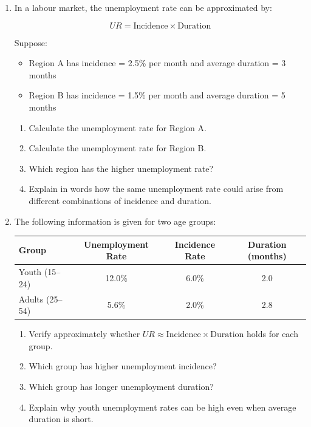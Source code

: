\documentclass[12pt]{article}
\begin{document}
\begin{enumerate}[label=\textbf{Question \arabic*.}]
\begin{enumerate}[label=(\alph*)]
    \item Calculate the net monthly change in unemployment.
    \item If the initial stock of unemployed workers is 960{,}000, what is the stock of unemployed workers at the end of the month?
    \item If the labour force is 16{,}000{,}000, what is the unemployment rate at the end of the month?
\end{enumerate}
\newpage
\item In a labour market, the unemployment rate can be approximated by:

\[
UR = \text{Incidence} \times \text{Duration}
\]

Suppose:
\begin{itemize}
    \item Region A has incidence = 2.5\% per month and average duration = 3 months
    \item Region B has incidence = 1.5\% per month and average duration = 5 months
\end{itemize}

\begin{enumerate}[label=(\alph*)]
    \item Calculate the unemployment rate for Region A.
    \item Calculate the unemployment rate for Region B.
    \item Which region has the higher unemployment rate?
    \item Explain in words how the same unemployment rate could arise from different combinations of incidence and duration.
\end{enumerate}

\item The following information is given for two age groups:

\begin{center}
\begin{tabular}{lccc}
\toprule
Group & Unemployment Rate & Incidence Rate & Duration (months) \\
\midrule
Youth (15--24) & 12.0\% & 6.0\% & 2.0 \\
Adults (25--54) & 5.6\% & 2.0\% & 2.8 \\
\bottomrule
\end{tabular}
\end{center}

\begin{enumerate}[label=(\alph*)]
    \item Verify approximately whether \(UR \approx \text{Incidence} \times \text{Duration}\) holds for each group.
    \item Which group has higher unemployment incidence?
    \item Which group has longer unemployment duration?
    \item Explain why youth unemployment rates can be high even when average duration is short.
\end{enumerate}


\end{enumerate}
\end{document}
